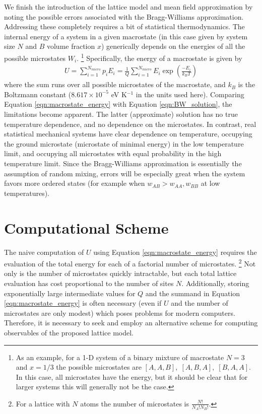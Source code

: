 \documentclass[10pt]{article}
\begin{document}
We finish the introduction of the lattice model and mean field approximation by noting the possible errors associated with the Bragg-Williams approximation.
Addressing these completely requires a bit of statistical thermodynamics.
The internal energy of a system in a given macrostate (in this case given by system size $N$ and $B$ volume fraction $x$) generically depends on the energies of all the possible microstates $W_i$. \footnote{As an example, for a 1-D system of a binary mixture of macrostate $N=3$ and $x=1/3$ the possible microstates are $[A,A,B],\; [A,B,A],\; [B,A,A]$. In this case, all microstates have the energy, but it should be clear that for larger systems this will generally not be the case.}
Specifically, the energy of a macrostate is given by
\begin{align}
    U = \sum_{i=1}^{N_{micro}} p_i E_i
    = \frac{1}{Q} \sum_{i=1}^{N_{micro}} E_i \exp\left(\frac{-E_i}{k_B T}\right)
    \label{eqn:macrostate_energy}
\end{align}
where the sum runs over all possible microstates of the macrostate, and $k_B$ is the Boltzmann constant ($8.617 \times 10^{-5}$ eV K$^{-1}$ in the units used here).
Comparing Equation \ref{eqn:macrostate_energy} with Equation \ref{eqn:BW_solution}, the limitations become apparent.
The latter (approximate) solution has no true temperature dependence, and no dependence on the microstates.
In contrast, real statistical mechanical systems have clear dependence on temperature, occupying the ground microstate (microstate of minimal energy) in the low temperature limit, and occupying all microstates with equal probability in the high temperature limit.
Since the Bragg-Williams approximation is essentially the assumption of random mixing, errors will be especially great when the system favors more ordered states (for example when $w_{AB}>w_{AA},w_{BB}$ at low temperatures).



\section{Computational Scheme}

The naive computation of $U$ using Equation \ref{eqn:macrostate_energy} requires the evaluation of the total energy for each of a factorial number of microstates. \footnote{For a lattice with $N$ atoms the number of microstates is $\frac{N!}{N_A!N_B!}$.}
Not only is the number of microstates quickly intractable, but each total lattice evaluation has cost proportional to the number of sites $N$. 
Additionally, storing exponentially large intermediate values for $Q$ and the summand in Equation \ref{eqn:macrostate_energy} is often necessary (even if $U$ and the number of microstates are only modest) which poses problems for modern computers.
Therefore, it is necessary to seek and employ an alternative scheme for computing observables of the proposed lattice model.
\end{document}
